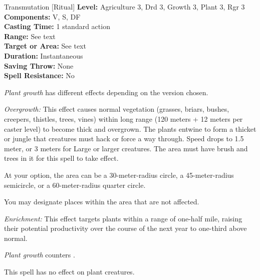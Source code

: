 {Transmutation [Ritual]}
{
	\textbf{Level:}
	Agriculture 3, Drd 3, Growth 3, Plant 3, Rgr 3\\
	\textbf{Components:}
	V, S, DF\\
	\textbf{Casting Time:}
	1 standard action\\
	\textbf{Range:}
	See text\\
	\textbf{Target or Area:}
	See text\\
	\textbf{Duration:}
	Instantaneous\\
	\textbf{Saving Throw:}
	None\\
	\textbf{Spell Resistance:}
	No\\
}
{
	\emph{Plant growth} has different effects depending on the version chosen.

	\textit{Overgrowth:}
	This effect causes normal vegetation (grasses, briars, bushes, creepers, thistles, trees, vines) within long range (120 meters + 12 meters per caster level) to become thick and overgrown. The plants entwine to form a thicket or jungle that creatures must hack or force a way through. Speed drops to 1.5 meter, or 3 meters for Large or larger creatures. The area must have brush and trees in it for this spell to take effect.

	At your option, the area can be a 30-meter-radius circle, a 45-meter-radius semicircle, or a 60-meter-radius quarter circle.

	You may designate places within the area that are not affected.

	\textit{Enrichment:}
	This effect targets plants within a range of one-half mile, raising their potential productivity over the course of the next year to one-third above normal.

	\emph{Plant growth} counters .

	This spell has no effect on plant creatures.

}

